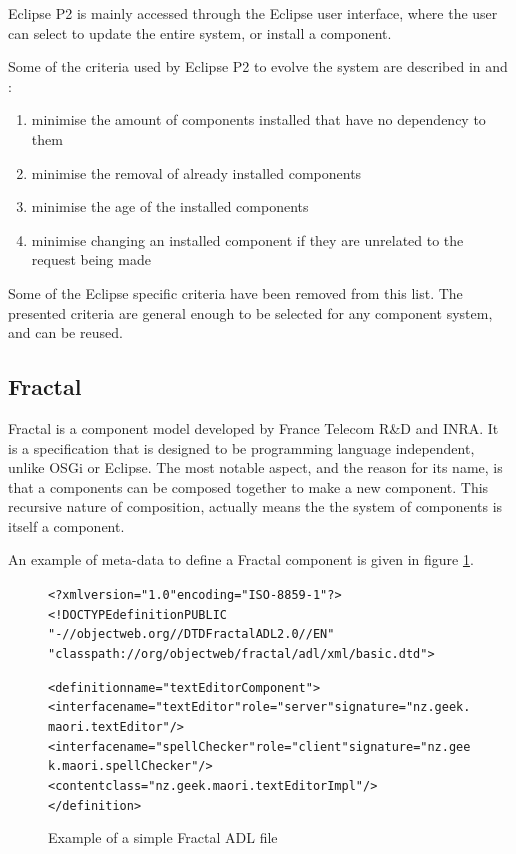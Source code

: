 Eclipse P2 is mainly accessed through the Eclipse user interface, where the user can select to update the entire system, or install a component.

Some of the criteria used by Eclipse P2 to evolve the system are described in \cite{le_berre_dependency_2009} and \cite{leBerre2010}:
\begin{enumerate}
  \item minimise the amount of components installed that have no dependency to them 
  \item minimise the removal of already installed components
  \item minimise the age of the installed components
  \item minimise changing an installed component if they are unrelated to the request being made
\end{enumerate} 

Some of the Eclipse specific criteria have been removed from this list.
The presented criteria are general enough to be selected for any component system, and can be reused.


\subsection{Fractal}
Fractal is a component model developed by France Telecom R\&D and INRA.
It is a specification that is designed to be programming language independent, unlike OSGi or Eclipse.
The most notable aspect, and the reason for its name, is that a components can be composed together to make a new component.
This recursive nature of composition, actually means the the system of components is itself a component.

An example of meta-data to define a Fractal component is given in figure \ref{fractalmetadata}.

\begin{figure}[htp]
\begin{center}
\begin{alltt}
<?xml version="1.0" encoding="ISO-8859-1" ?>
<!DOCTYPE definition PUBLIC 
    "-//objectweb.org//DTD Fractal ADL 2.0//EN" 
    "classpath://org/objectweb/fractal/adl/xml/basic.dtd">

<definition name="textEditorComponent">
  <interface name="textEditor" role="server" signature="nz.geek.maori.textEditor"/>
  <interface name="spellChecker" role="client" signature="nz.geek.maori.spellChecker"/>
  <content class="nz.geek.maori.textEditorImpl"/>
</definition>
\end{alltt}
  \caption[Fractal ADL Example]{Example of a simple Fractal ADL file}
  \label{fractalmetadata}
\end{center}
\end{figure}

